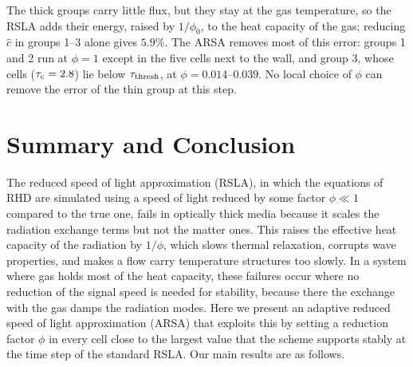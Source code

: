 \documentclass[preprint,12pt,authoryear]{elsarticle}
\begin{document}
The thick groups carry little flux, but they stay at the gas temperature, so the RSLA adds their energy, raised by $1/\phi_0$, to the heat capacity of the gas; reducing $\hat{c}$ in groups 1--3 alone gives $5.9\%$. The ARSA removes most of this error: groups 1 and 2 run at $\phi = 1$ except in the five cells next to the wall, and group 3, whose cells ($\tau_{\rm c} = 2.8$) lie below $\tau_{\rm thresh}$, at $\phi = 0.014$--$0.039$. No local choice of $\phi$ can remove the error of the thin group at this step.


\section{Summary and Conclusion}
\label{sec:summary}

The reduced speed of light approximation (RSLA), in which the equations of RHD are simulated using a speed of light reduced by some factor $\phi \ll 1$ compared to the true one, fails in optically thick media because it scales the radiation exchange terms but not the matter ones. This raises the effective heat capacity of the radiation by $1/\phi$, which slows thermal relaxation, corrupts wave properties, and makes a flow carry temperature structures too slowly. In a system where gas holds most of the heat capacity, these failures occur where no reduction of the signal speed is needed for stability, because there the exchange with the gas damps the radiation modes. Here we present an adaptive reduced speed of light approximation (ARSA) that exploits this by setting a reduction factor $\phi$ in every cell close to the largest value that the scheme supports stably at the time step of the standard RSLA. Our main results are as follows.
\end{document}

